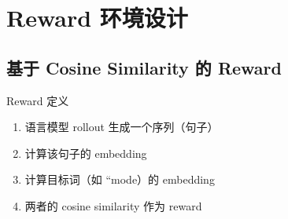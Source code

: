 \section{Reward 环境设计}
\subsection{基于 Cosine Similarity 的 Reward}
\begin{importantbox}{Reward 定义}
\begin{enumerate}
  \item 语言模型 rollout 生成一个序列（句子）
  \item 计算该句子的 embedding
  \item 计算目标词（如 ``mode）的 embedding
  \item 两者的 cosine similarity 作为 reward
\end{enumerate}
\end{importantbox}

